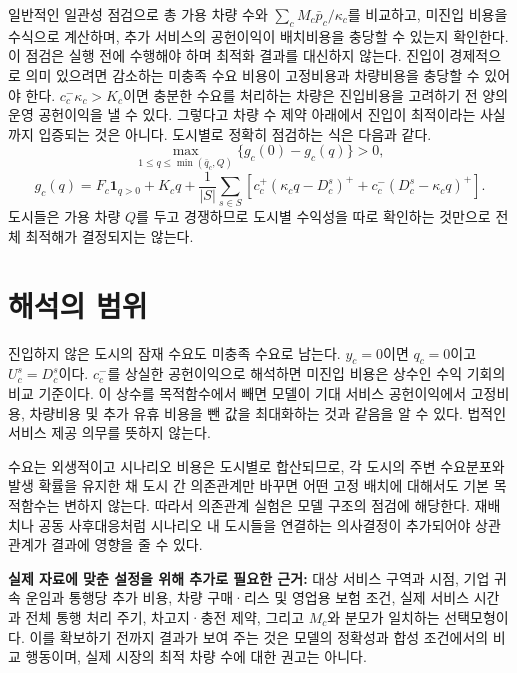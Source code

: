 \documentclass[10pt,a4paper]{article}
\begin{document}
일반적인 일관성 점검으로 총 가용 차량 수와 $\sum_c M_c\bar p_c/\kappa_c$를 비교하고, 미진입 비용을 수식으로 계산하며, 추가 서비스의 공헌이익이 배치비용을 충당할 수 있는지 확인한다. 이 점검은 실행 전에 수행해야 하며 최적화 결과를 대신하지 않는다.
진입이 경제적으로 의미 있으려면 감소하는 미충족 수요 비용이 고정비용과 차량비용을 충당할 수 있어야 한다. $c_c^-\kappa_c>K_c$이면 충분한 수요를 처리하는 차량은 진입비용을 고려하기 전 양의 운영 공헌이익을 낼 수 있다. 그렇다고 차량 수 제약 아래에서 진입이 최적이라는 사실까지 입증되는 것은 아니다. 도시별로 정확히 점검하는 식은 다음과 같다.
\[
\max_{1\le q\le\min(\bar q_c,Q)}\{g_c(0)-g_c(q)\}>0,
\]
\[
g_c(q)=F_c\mathbf1_{q>0}+K_cq+
\frac{1}{|S|}\sum_{s\in S}[c_c^+(\kappa_cq-D_c^s)^++c_c^-(D_c^s-\kappa_cq)^+].
\]
도시들은 가용 차량 $Q$를 두고 경쟁하므로 도시별 수익성을 따로 확인하는 것만으로 전체 최적해가 결정되지는 않는다.

\section{해석의 범위}
진입하지 않은 도시의 잠재 수요도 미충족 수요로 남는다. $y_c=0$이면 $q_c=0$이고 $U_c^s=D_c^s$이다. $c_c^-$를 상실한 공헌이익으로 해석하면 미진입 비용은 상수인 수익 기회의 비교 기준이다. 이 상수를 목적함수에서 빼면 모델이 기대 서비스 공헌이익에서 고정비용, 차량비용 및 추가 유휴 비용을 뺀 값을 최대화하는 것과 같음을 알 수 있다. 법적인 서비스 제공 의무를 뜻하지 않는다.

수요는 외생적이고 시나리오 비용은 도시별로 합산되므로, 각 도시의 주변 수요분포와 발생 확률을 유지한 채 도시 간 의존관계만 바꾸면 어떤 고정 배치에 대해서도 기본 목적함수는 변하지 않는다. 따라서 의존관계 실험은 모델 구조의 점검에 해당한다. 재배치나 공동 사후대응처럼 시나리오 내 도시들을 연결하는 의사결정이 추가되어야 상관관계가 결과에 영향을 줄 수 있다.

\textbf{실제 자료에 맞춘 설정을 위해 추가로 필요한 근거:} 대상 서비스 구역과 시점, 기업 귀속 운임과 통행당 추가 비용, 차량 구매·리스 및 영업용 보험 조건, 실제 서비스 시간과 전체 통행 처리 주기, 차고지·충전 제약, 그리고 $M_c$와 분모가 일치하는 선택모형이다. 이를 확보하기 전까지 결과가 보여 주는 것은 모델의 정확성과 합성 조건에서의 비교 행동이며, 실제 시장의 최적 차량 수에 대한 권고는 아니다.
\end{document}
